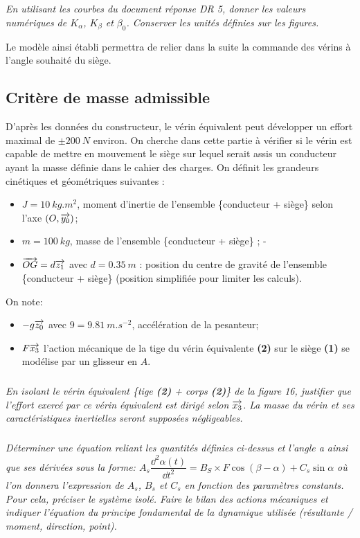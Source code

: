 \documentclass[10pt,fleqn]{article} %
\begin{document}
\subparagraph{}
\textit{En utilisant les courbes du document réponse DR 5, donner les valeurs numériques de $K_{\alpha}$, $K_{\beta}$ et $\beta_0$. Conserver les unités définies sur les figures.}

Le modèle ainsi établi permettra de relier dans la suite la commande des vérins à l'angle souhaité du siège. 

\subsection{Critère de masse admissible}
D'après les données du constructeur, le vérin équivalent peut développer un effort maximal de 
$\pm \SI{200}{N}$ environ. On cherche dans cette partie à vérifier si le vérin est capable de mettre en mouvement le siège sur lequel serait assis un conducteur ayant la masse définie dans le cahier des charges. 
On définit les grandeurs cinétiques et géométriques suivantes : 
\begin{itemize}
\item $J = \SI{10}{kg. m^2}$, moment d'inertie de l'ensemble \{conducteur + siège\} selon l'axe $\left(O,\overrightarrow{y_0}\right)$; 
\item $m = \SI{100}{kg}$, masse de l'ensemble \{conducteur + siège\} ; 
- 
\item $\overrightarrow{OG} = d\overrightarrow{z_1}$ avec $d = \SI{0,35}{m}$ : position du centre de gravité de l'ensemble \{conducteur + siège\} (position simplifiée pour limiter les calculs). 
\end{itemize}
On note: 
\begin{itemize}
\item $-g \overrightarrow{z_0}$ avec $9 = \SI{9,81}{m.s^{-2}}$, accélération de la pesanteur; 
\item $F\overrightarrow{x_3}$ l'action mécanique de la tige du vérin équivalente \textbf{(2)} sur le siège \textbf{(1)} se modélise par un glisseur en $A$. 
\end{itemize}

\subparagraph{}
\textit{En isolant le vérin équivalent \{tige \textbf{(2)} + corps \textbf{(2)}\} de la figure 16, %
justifier que l'effort exercé par ce vérin équivalent est dirigé selon $\overrightarrow{x_3}$. La masse du vérin et ses caractéristiques inertielles seront supposées négligeables.}


\subparagraph{}
\textit{Déterminer une équation reliant les quantités définies ci-dessus et l'angle a ainsi que ses dérivées sous la forme:  $A_s\dfrac{\dd^2 \alpha(t)}{\dd t^2}=B_S \times F \cos \left(\beta - \alpha\right)+C_s \sin \alpha$ 
où l'on donnera l'expression de $A_s$, $B_s$ et $C_s$ en fonction des paramètres constants. 
Pour cela, préciser le système isolé. Faire le bilan des actions mécaniques et indiquer l'équation du principe fondamental de la dynamique utilisée (résultante / moment, direction, point). }
\end{document}
